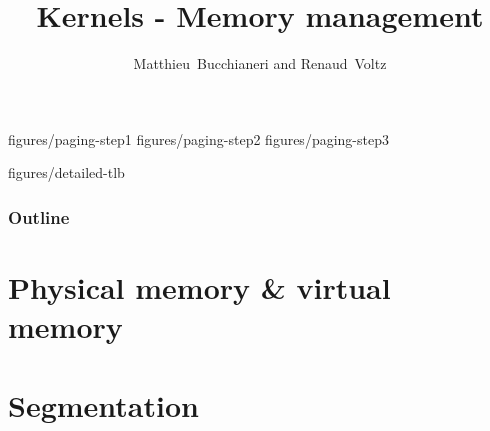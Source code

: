 
%
%



%
%

\title{Kernels - Memory management}

%
%

\author
{
  Matthieu~Bucchianeri and Renaud~Voltz
}

%
%

%

%

		{figures/paging-step1}
		{figures/paging-step2}
		{figures/paging-step3}


		{figures/detailed-tlb}

%
%



%
%

\begin{frame}
  \titlepage

  \begin{center}
    \logos
  \end{center}
\end{frame}

%
%

\begin{frame}
  \frametitle{Outline}
  \tableofcontents
\end{frame}

%
%

\section{Physical memory \& virtual memory}


%
%

\section{Segmentation}

